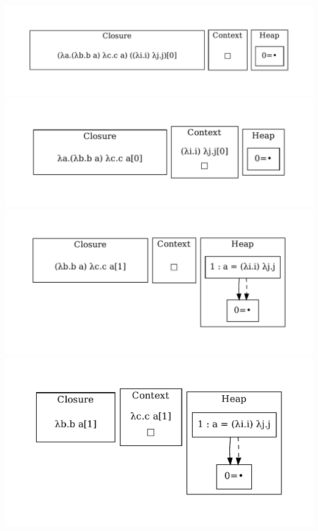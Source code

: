 \includegraphics[width=\linewidth/2]{figures/1.pdf}
\includegraphics[width=\linewidth/2]{figures/2.pdf}
\includegraphics[width=\linewidth/2]{figures/3.pdf}
\includegraphics[width=\linewidth/2]{figures/4.pdf}
